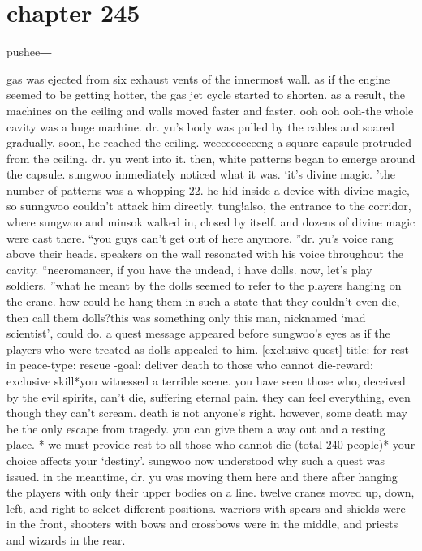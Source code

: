 \section{chapter 245}

                            pushee―




gas was ejected from six exhaust vents of the innermost wall.
 as if the engine seemed to be getting hotter, the gas jet cycle started to shorten.
as a result, the machines on the ceiling and walls moved faster and faster.
ooh ooh ooh-the whole cavity was a huge machine.
dr.
 yu’s body was pulled by the cables and soared gradually.
 soon, he reached the ceiling.
weeeeeeeeeeng-a square capsule protruded from the ceiling.
 dr.
 yu went into it.
 then, white patterns began to emerge around the capsule.
sungwoo immediately noticed what it was.
‘it’s divine magic.
’the number of patterns was a whopping 22.
 he hid inside a device with divine magic, so sunngwoo couldn’t attack him directly.
tung!also, the entrance to the corridor, where sungwoo and minsok walked in, closed by itself.
 and dozens of divine magic were cast there.
“you guys can’t get out of here anymore.
”dr.
 yu’s voice rang above their heads.
 speakers on the wall resonated with his voice throughout the cavity.
“necromancer, if you have the undead, i have dolls.
 now, let’s play soldiers.
”what he meant by the dolls seemed to refer to the players hanging on the crane.
how could he hang them in such a state that they couldn’t even die, then call them dolls?this was something only this man, nicknamed ‘mad scientist’, could do.
a quest message appeared before sungwoo’s eyes as if the players who were treated as dolls appealed to him.
[exclusive quest]-title: for rest in peace-type: rescue
-goal: deliver death to those who cannot die-reward: exclusive skill*you witnessed a terrible scene.
 you have seen those who, deceived by the evil spirits, can’t die, suffering eternal pain.
 they can feel everything, even though they can’t scream.
death is not anyone’s right.
 however, some death may be the only escape from tragedy.
 you can give them a way out and a resting place.
* we must provide rest to all those who cannot die (total 240 people)* your choice affects your ‘destiny’.
sungwoo now understood why such a quest was issued.
in the meantime, dr.
 yu was moving them here and there after hanging the players with only their upper bodies on a line.
twelve cranes moved up, down, left, and right to select different positions.
warriors with spears and shields were in the front, shooters with bows and crossbows were in the middle, and priests and wizards in the rear.
